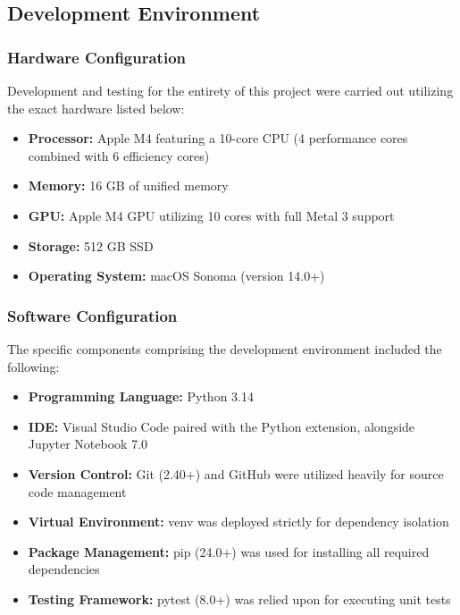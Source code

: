 
\subsection{Development Environment}

\subsubsection{Hardware Configuration}

Development and testing for the entirety of this project were carried out utilizing the exact hardware listed below:

\begin{itemize}
    \item \textbf{Processor:} Apple M4 featuring a 10-core CPU (4 performance cores combined with 6 efficiency cores)
    \item \textbf{Memory:} 16 GB of unified memory
    \item \textbf{GPU:} Apple M4 GPU utilizing 10 cores with full Metal 3 support
    \item \textbf{Storage:} 512 GB SSD
    \item \textbf{Operating System:} macOS Sonoma (version 14.0+)
\end{itemize}

\subsubsection{Software Configuration}

The specific components comprising the development environment included the following:

\begin{itemize}
    \item \textbf{Programming Language:} Python 3.14
    \item \textbf{IDE:} Visual Studio Code paired with the Python extension, alongside Jupyter Notebook 7.0
    \item \textbf{Version Control:} Git (2.40+) and GitHub were utilized heavily for source code management
    \item \textbf{Virtual Environment:} venv was deployed strictly for dependency isolation
    \item \textbf{Package Management:} pip (24.0+) was used for installing all required dependencies
    \item \textbf{Testing Framework:} pytest (8.0+) was relied upon for executing unit tests
\end{itemize}

